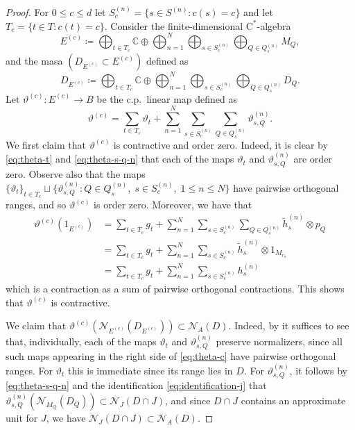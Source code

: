 \documentclass[11pt,a4paper]{amsart}
\theoremstyle{definition}
\numberwithin{equation}{section}
\newcommand{\mc}[1]{\mathcal{#1}}
\newcommand{\bb}[1]{\mathbb{#1}}
\begin{document}
\begin{proof}
For $0\le c\le d$ let $S_c^{(n)}=\{s\in S^{(n)}: c(s)=c\}$ and let $T_c=\{t\in T: c(t)=c\}$. Consider the finite-dimensional $\mathrm{C}^\ast$-algebra
\begin{equation}\label{eq:Ec}
E^{(c)}\coloneqq \bigoplus_{t\in T_c}\bb{C} \oplus \bigoplus_{n=1}^N\bigoplus_{s\in S^{(n)}_c}\bigoplus_{Q\in Q_s^{(n)}}M_Q,
\end{equation}
and the masa $(D_{E^{(c)}}\subset E^{(c)})$ defined as
\begin{equation}\label{eq:Dc}
D_{E^{(c)}}\coloneqq \bigoplus_{t\in T_c}\bb{C}\oplus\bigoplus_{n=1}^N\bigoplus_{s\in S^{(n)}_c}\bigoplus_{Q\in Q_s^{(n)}}D_Q.
\end{equation}
Let $\vartheta^{(c)}\colon E^{(c)}\to B$ be the c.p.\ linear map defined as
\begin{equation}\label{eq:theta-c}
\vartheta^{(c)}=\sum_{t\in T_c}\vartheta_t+\sum_{n=1}^N\sum_{s\in S_c^{(n)}}\sum_{Q\in Q_s^{(n)}}\vartheta_{s,Q}^{(n)}.
\end{equation}
We first claim that $\vartheta^{(c)}$ is contractive and order zero. Indeed, it is clear by \eqref{eq:theta-t} and \eqref{eq:theta-s-q-n} that each of the maps $\vartheta_t$ and $\vartheta_{s,Q}^{(n)}$ are order zero. Observe also that the maps $\{\vartheta_t\}_{t\in T_c}\sqcup\{\vartheta_{s,Q}^{(n)}: Q\in Q_s^{(n)},\; s\in S_c^{(n)},\; 1\le n\le N\}$  have pairwise orthogonal ranges, and so $\vartheta^{(c)}$ is order zero. Moreover, we have that
\begin{align}\label{eq:ev-at-1}
\vartheta^{(c)}(1_{E^{(c)}}) &=\sum_{t\in T_c}g_t + \sum_{n=1}^N\sum_{s\in S_c^{(n)}}\sum_{Q\in Q_s^{(n)}}\tilde{h}_s^{(n)}\otimes p_Q\\
&=\sum_{t\in T_c}g_t + \sum_{n=1}^N\sum_{s\in S_c^{(n)}}\tilde{h}_s^{(n)}\otimes 1_{M_{r_n}}\nonumber\\
&=\sum_{t\in T_c}g_t+\sum_{n=1}^N\sum_{s\in S_c^{(n)}}h_s^{(n)}\nonumber
\end{align}
which is a contraction as a sum of pairwise orthogonal contractions. This shows that $\vartheta^{(c)}$ is contractive. 

We claim that $\vartheta^{(c)}(\mathcal{N}_{E^{(c)}}(D_{E^{(c)}}))\subset\mathcal{N}_A(D)$. Indeed, by \cite[Lemma~1.4]{LiaTik22}
it suffices to see that, individually, each of the maps $\vartheta_t$ and $\vartheta_{s,Q}^{(n)}$ preserve normalizers, since all such maps appearing in the right side of \eqref{eq:theta-c} have pairwise orthogonal ranges. For $\vartheta_t$ this is immediate since its range lies in $D$. For $\vartheta_{s,Q}^{(n)}$, it follows by \eqref{eq:theta-s-q-n} and the identification \eqref{eq:identification-j} that $\vartheta_{s,Q}^{(n)}(\mc{N}_{M_Q}(D_Q))\subset\mc{N}_J(D\cap J)$, and since $D\cap J$ contains an approximate unit for $J$, we have $\mc{N}_J(D\cap J)\subset\mc{N}_A(D)$.


\end{proof}
\end{document}
